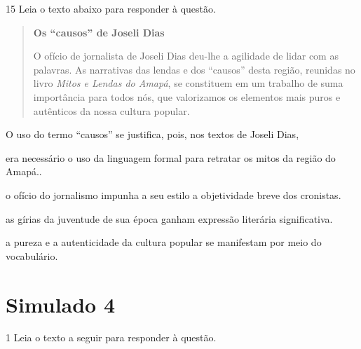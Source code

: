 \num{15} Leia o texto abaixo para responder à questão. 

\begin{quote}

\textbf{Os ``causos'' de Joseli Dias}

O ofício de jornalista de Joseli Dias deu-lhe a agilidade de lidar com
as palavras. As narrativas das lendas e dos ``causos'' desta região,
reunidas no livro \textit{Mitos e Lendas do Amapá}, se constituem em um trabalho
de suma importância para todos nós, que valorizamos os elementos mais
puros e autênticos da nossa cultura popular.


\end{quote}

O uso do termo ``causos'' se justifica, pois, nos textos de Joseli Dias,

\begin{escolha}
    
    \item era necessário o uso da linguagem formal para retratar os mitos da região do Amapá..
    
    \item o ofício do jornalismo impunha a seu estilo a objetividade breve dos cronistas.
    
    \item as gírias da juventude de sua época ganham expressão literária significativa.
    
    \item a pureza e a autenticidade da cultura popular se manifestam por meio do vocabulário.

\end{escolha}


\pagebreak

\section*{Simulado 4}

\num{1} Leia o texto a seguir para responder à questão. 


